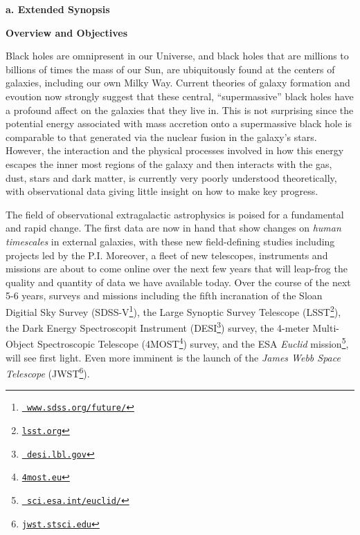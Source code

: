 \documentclass[oneside, a4paper, onecolumn, 11pt]{article}
\begin{document}
\smallskip
\smallskip
\noindent
{\bf{\textcolor{Cerulean}{a. Extended Synopsis}}} 
\vspace{6pt}

\noindent
\large
{\bf{\textcolor{Cerulean}{Overview and Objectives}}}
\normalsize


\smallskip
\smallskip
\noindent
Black holes are omnipresent in our Universe, and black holes that are
millions to billions of times the mass of our Sun, are ubiquitously
found at the centers of galaxies, including our own Milky Way.
Current theories of galaxy formation and evoution now strongly suggest
that these central, ``supermassive'' black holes have a profound
affect on the galaxies that they live in. This is not surprising since
the potential energy associated with mass accretion onto a
supermassive black hole is comparable to that generated via the
nuclear fusion in the galaxy's stars. However, the interaction and the
physical processes involved in how this energy escapes the inner most
regions of the galaxy and then interacts with the gas, dust, stars and
dark matter, is currently very poorly understood theoretically, with
observational data giving little insight on how to make key progress.

\smallskip
\smallskip
\noindent
The field of observational extragalactic astrophysics is poised for a
fundamental and rapid change. The first data are now in hand that show
changes on {\it human timescales} in external galaxies, with these new
field-defining studies including projects led by the P.I.  Moreover, a
fleet of new telescopes, instruments and missions are about to come
online over the next few years that will leap-frog the quality and
quantity of data we have available today. Over the course of the next
5-6 years, surveys and missions including the fifth incranation of the
Sloan Digitial Sky Survey
(SDSS-V\footnote{\href{www.sdss.org/future/}{{\tt
www.sdss.org/future/}}}), the Large Synoptic Survey Telescope
(LSST\footnote{\href{lsst.org}{{\tt lsst.org}}}), the Dark Energy
Spectroscopit Instrument (DESI\footnote{\href{desi.lbl.gov}{{\tt
desi.lbl.gov}}}) survey, the 4-meter Multi-Object Spectroscopic
Telescope (4MOST\footnote{\href{4most.eu}{{\tt 4most.eu}}}) survey,
and the ESA {\it Euclid}
mission\footnote{\href{sci.esa.int/euclid/}{{\tt
sci.esa.int/euclid/}}}, will see first light. Even more imminent is
the launch of the {\it James Webb Space Telescope}
(JWST\footnote{\href{jwst.stsci.edu}{{\tt jwst.stsci.edu}}}).
\end{document}

